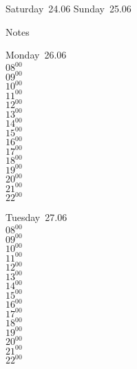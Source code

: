 \documentclass[11pt,a4paper]{book}\usepackage[]{graphicx}\usepackage[]{color}
\begin{document}
\begin{weekendbox}
  Saturday~24.06
  \tcblower
  Sunday~25.06
\end{weekendbox} %
\begin{notebox}
  Notes
\end{notebox}
\clearpage
\begin{headerbox}
\end{headerbox}
\begin{weekdaybox}
  Monday~26.06\\
  { 
  \vfill
  $08^{00}$\\
$09^{00}$\\
$10^{00}$\\
$11^{00}$\\
$12^{00}$\\
$13^{00}$\\
$14^{00}$\\
$15^{00}$\\
$16^{00}$\\
$17^{00}$\\
$18^{00}$\\
$19^{00}$\\
$20^{00}$\\
$21^{00}$\\
$22^{00}$\\
  }
\end{weekdaybox}
\begin{weekdaybox}
  Tuesday~27.06\\
  { 
  \vfill
  $08^{00}$\\
$09^{00}$\\
$10^{00}$\\
$11^{00}$\\
$12^{00}$\\
$13^{00}$\\
$14^{00}$\\
$15^{00}$\\
$16^{00}$\\
$17^{00}$\\
$18^{00}$\\
$19^{00}$\\
$20^{00}$\\
$21^{00}$\\
$22^{00}$\\
  }
\end{weekdaybox}
\end{document}
